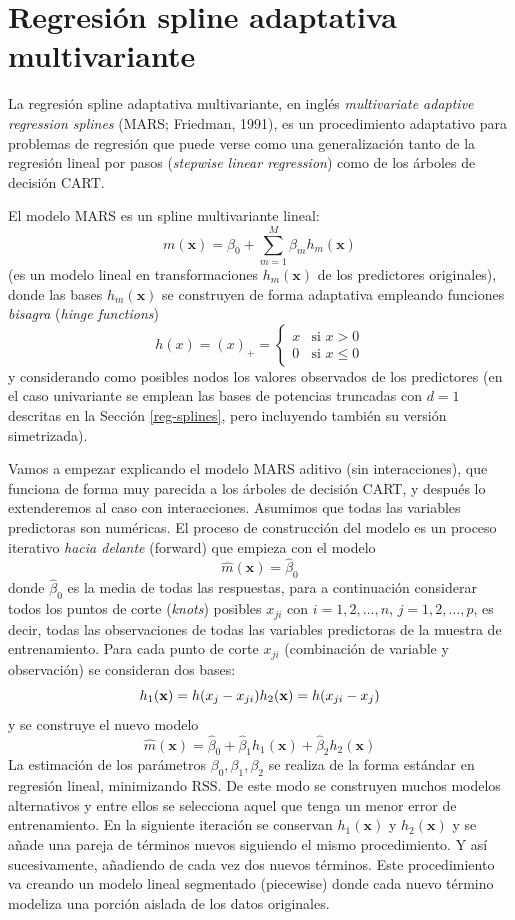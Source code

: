 \documentclass[
]{book}
\theoremstyle{break}
\theoremstyle{definition}
\theoremstyle{definition}
\theoremstyle{definition}
\theoremstyle{remark}
\begin{document}
\hypertarget{mars}{%
\section{Regresión spline adaptativa multivariante}\label{mars}}

La regresión spline adaptativa multivariante, en inglés \emph{multivariate adaptive regression splines} (MARS; Friedman, 1991), es un procedimiento adaptativo para problemas de regresión que puede verse como una generalización tanto de la regresión lineal por pasos (\emph{stepwise linear regression}) como de los árboles de decisión CART.

El modelo MARS es un spline multivariante lineal:\\
\[m(\mathbf{x}) = \beta_0 + \sum_{m=1}^M \beta_m h_m(\mathbf{x})\]
(es un modelo lineal en transformaciones \(h_m(\mathbf{x})\) de los predictores originales), donde las bases \(h_m(\mathbf{x})\) se construyen de forma adaptativa empleando funciones \emph{bisagra} (\emph{hinge functions})
\[ h(x) = (x)_+ = \left\{ \begin{array}{ll}
  x & \mbox{si } x > 0 \\
  0 & \mbox{si } x \leq 0
  \end{array}
  \right.\]
y considerando como posibles nodos los valores observados de los predictores
(en el caso univariante se emplean las bases de potencias truncadas con \(d=1\) descritas en la Sección \ref{reg-splines}, pero incluyendo también su versión simetrizada).

Vamos a empezar explicando el modelo MARS aditivo (sin interacciones), que funciona de forma muy parecida a los árboles de decisión CART, y después lo extenderemos al caso con interacciones.
Asumimos que todas las variables predictoras son numéricas. El proceso de construcción del modelo es un proceso iterativo \emph{hacia delante} (forward) que empieza con el modelo
\[\hat m(\mathbf{x}) = \hat \beta_0 \]
donde \(\hat \beta_0\) es la media de todas las respuestas, para a continuación considerar todos los puntos de corte (\emph{knots}) posibles \(x_{ji}\) con \(i = 1, 2, \ldots, n\), \(j = 1, 2, \ldots, p\), es decir, todas las observaciones de todas las variables predictoras de la muestra de entrenamiento.
Para cada punto de corte \(x_{ji}\) (combinación de variable y observación) se consideran dos bases:
\[h_1(\mathbf{x}) = h(x_j - x_{ji}) \\
h_2(\mathbf{x}) = h(x_{ji} - x_j)\]
y se construye el nuevo modelo
\[\hat m(\mathbf{x}) = \hat \beta_0 + \hat \beta_1 h_1(\mathbf{x}) + \hat \beta_2 h_2(\mathbf{x})\]
La estimación de los parámetros \(\beta_0, \beta_1, \beta_2\) se realiza de la forma estándar en regresión lineal, minimizando \(\mbox{RSS}\). De este modo se construyen muchos modelos alternativos y entre ellos se selecciona aquel que tenga un menor error de entrenamiento. En la siguiente iteración se conservan \(h_1(\mathbf{x})\) y \(h_2(\mathbf{x})\) y se añade una pareja de términos nuevos siguiendo el mismo procedimiento. Y así sucesivamente, añadiendo de cada vez dos nuevos términos. Este procedimiento va creando un modelo lineal segmentado (piecewise) donde cada nuevo término modeliza una porción aislada de los datos originales.
\end{document}
